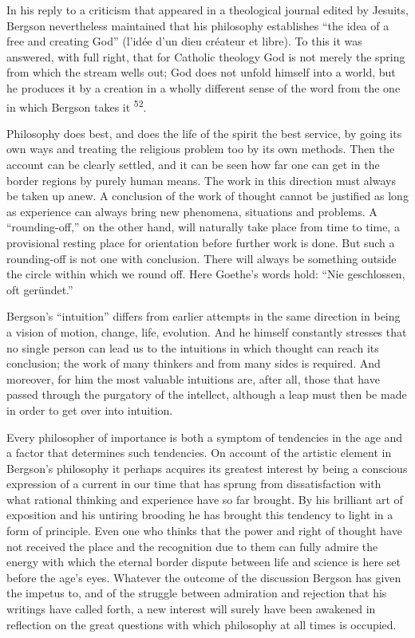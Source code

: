 \documentclass[12pt,a4paper,openany]{book}
\newcommand{\opage}[1]{\marginnote{\footnotesize\textit{[#1]}}}
\newcommand{\nm}[1]{\unskip\textsuperscript{#1}}
\begin{document}
In his reply to a criticism that appeared in a theological journal edited by Jesuits, Bergson nevertheless maintained that his philosophy establishes ``the idea of a free and creating God'' (l'idée d'un dieu créateur et libre). To this it was answered, with full right, that for Catholic theology God is not merely the spring from which the stream wells out; God does not unfold himself into a world, but he produces it by a creation in a wholly different sense of the word from the one in which Bergson takes it \nm{52}.

Philosophy does best, and does the life of the spirit the best service, by going its own ways and treating the religious problem too by its own methods. Then the account can be clearly settled, and it can be seen how far one can get in the border regions by purely human means. The work in this direction must always be taken up anew. A conclusion of the work of thought cannot be justified as long as experience can always bring new phenomena, situations and problems. A ``rounding-off,'' on the other hand, will naturally take place from time to time, a provisional resting place for orientation before further work is done. But such a rounding-off is not one with conclusion. There will always be something outside the circle within which we round off. Here Goethe's words hold: ``Nie geschlossen, oft geründet.''

Bergson's ``intuition'' differs from earlier attempts in the same direction in being a vision of motion, change, life, evolution. And he himself constantly stresses that no single person can lead us to the intuitions in which thought can reach its conclusion; the work of many thinkers and from many sides is required. And moreover, for him the most valuable intuitions are, after all, those that have passed through the purgatory of the
\opage{62}intellect, although a leap must then be made in order to get over into intuition.

Every philosopher of importance is both a symptom of tendencies in the age and a factor that determines such tendencies. On account of the artistic element in Bergson's philosophy it perhaps acquires its greatest interest by being a conscious expression of a current in our time that has sprung from dissatisfaction with what rational thinking and experience have so far brought. By his brilliant art of exposition and his untiring brooding he has brought this tendency to light in a form of principle. Even one who thinks that the power and right of thought have not received the place and the recognition due to them can fully admire the energy with which the eternal border dispute between life and science is here set before the age's eyes. Whatever the outcome of the discussion Bergson has given the impetus to, and of the struggle between admiration and rejection that his writings have called forth, a new interest will surely have been awakened in reflection on the great questions with which philosophy at all times is occupied.
\end{document}

